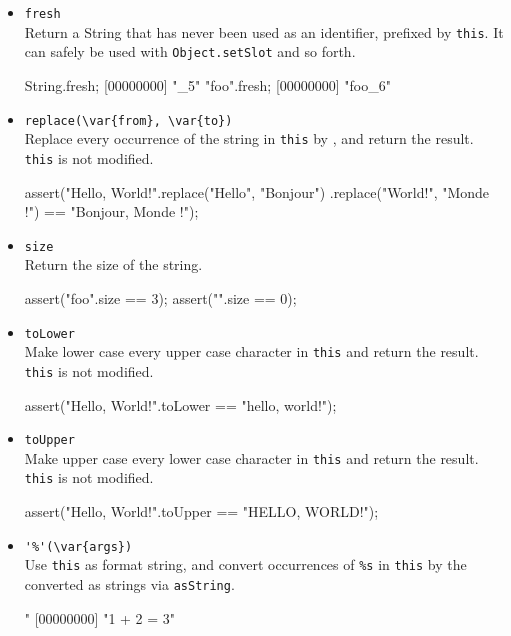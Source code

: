 \begin{itemize}
\item \lstinline|fresh|\\
  Return a String that has never been used as an identifier, prefixed
  by \lstinline|this|.  It can safely be used with
  \lstinline|Object.setSlot| and so forth.
\begin{urbiscript}[firstnumber=last]
String.fresh;
[00000000] "_5"
"foo".fresh;
[00000000] "foo_6"
\end{urbiscript}

\item \lstinline|replace(\var{from}, \var{to})|\\
  Replace every occurrence of the string  in
  \lstinline|this| by , and return the result.
  \lstinline|this| is not modified.
\begin{urbiscript}[firstnumber=last]
assert("Hello, World!".replace("Hello", "Bonjour")
                      .replace("World!", "Monde !")
       == "Bonjour, Monde !");
\end{urbiscript}

\item \lstinline|size|\\
  Return the size of the string.
\begin{urbiscript}[firstnumber=last]
assert("foo".size == 3);
assert("".size == 0);
\end{urbiscript}

\item \lstinline|toLower|\\
  Make lower case every upper case character in \lstinline|this| and
  return the result.  \lstinline|this| is not modified.
\begin{urbiscript}[firstnumber=last]
assert("Hello, World!".toLower == "hello, world!");
\end{urbiscript}

\item \lstinline|toUpper|\\
  Make upper case every lower case character in \lstinline|this| and
  return the result.  \lstinline|this| is not modified.
\begin{urbiscript}[firstnumber=last]
assert("Hello, World!".toUpper == "HELLO, WORLD!");
\end{urbiscript}

\item \lstinline|'%'(\var{args})|\\
  Use \lstinline|this| as format string, and convert occurrences of
  \lstinline|%s| in \lstinline|this| by the  converted as
  strings via \lstinline|asString|.
\begin{urbiscript}[firstnumber=last]
"%
[00000000] "1 + 2 = 3"
\end{urbiscript}


\end{itemize}
